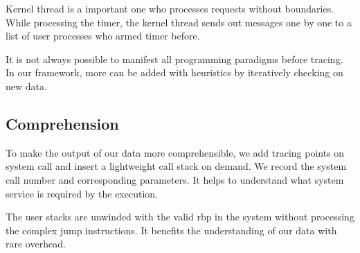 Kernel thread is a important one who processes requests without boundaries.
While processing the timer, the kernel thread sends out messages one by one to
a list of user processes who armed timer before.

It is not always possible to manifest all programming paradigms before tracing.
In our framework, more can be added with heuristics by iteratively checking on
new data.

\subsection{Comprehension}
To make the output of our data more comprehensible, we add tracing points on system call and insert a lightweight call stack on demand.
We record the system call number and corresponding parameters. It helps to
understand what system service is required by the execution.

The user stacks are unwinded with the valid rbp in the system without
processing the complex jump instructions. It benefits the understanding of our
data with rare overhead.
